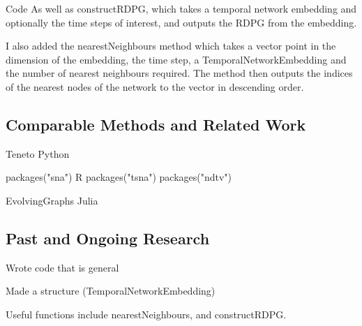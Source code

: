 \documentclass[12pt]{amsart}
\begin{document}
\begin{section}{Code}
        As well as constructRDPG, which takes a temporal network embedding and optionally the time steps of interest, and outputs the RDPG from the embedding.

        I also added the nearestNeighbours method which takes a vector point in the dimension of the embedding, the time step, a TemporalNetworkEmbedding and the number of nearest neighbours required. The method then outputs the indices of the nearest nodes of the network to the vector in descending order.
 
    \subsection{Comparable Methods and Related Work}
    Teneto Python

    packages("sna")  R
    packages("tsna")
    packages("ndtv")

    EvolvingGraphs Julia

    \subsection{Past and Ongoing Research}
    Wrote code that is general
    
    Made a structure (TemporalNetworkEmbedding)

    Useful functions include nearestNeighbours, and constructRDPG.
\end{section}


\printbibliography
\end{document}

